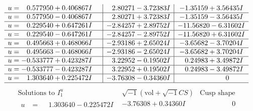 \documentclass[1p]{elsarticle_modified}
\theoremstyle{definition}
\newcommand{\I}{\sqrt{-1}}
\begin{document}
$$\begin{array}{c|c|c}
\begin{aligned}
u &= \phantom{-}0.577950 + 0.406867 I\end{aligned}
 & \phantom{-}2.80271 - 3.72383 I & -1.35159 + 3.56435 I \\ \hline\begin{aligned}
u &= \phantom{-}0.577950 - 0.406867 I\end{aligned}
 & \phantom{-}2.80271 + 3.72383 I & -1.35159 - 3.56435 I \\ \hline\begin{aligned}
u &= \phantom{-}0.229540 + 0.647261 I\end{aligned}
 & -2.84257 + 2.89752 I & -11.56820 - 6.31602 I \\ \hline\begin{aligned}
u &= \phantom{-}0.229540 - 0.647261 I\end{aligned}
 & -2.84257 - 2.89752 I & -11.56820 + 6.31602 I \\ \hline\begin{aligned}
u &= \phantom{-}0.495663 + 0.468066 I\end{aligned}
 & -2.93186 + 2.65024 I & -3.65682 - 3.70204 I \\ \hline\begin{aligned}
u &= \phantom{-}0.495663 - 0.468066 I\end{aligned}
 & -2.93186 - 2.65024 I & -3.65682 + 3.70204 I \\ \hline\begin{aligned}
u &= -0.533777 + 0.423287 I\end{aligned}
 & \phantom{-}3.22952 - 0.19502 I & \phantom{-}0.24983 + 3.49872 I \\ \hline\begin{aligned}
u &= -0.533777 - 0.423287 I\end{aligned}
 & \phantom{-}3.22952 + 0.19502 I & \phantom{-}0.24983 - 3.49872 I \\ \hline\begin{aligned}
u &= \phantom{-}1.303640 + 0.225472 I\end{aligned}
 & -3.76308 - 0.34360 I & \phantom{-0.000000 } 0\\
 \hline 
 \end{array}$$\newpage$$\begin{array}{c|c|c}  
\text{Solutions to }I^u_{1}& \I (\text{vol} + \sqrt{-1}CS) & \text{Cusp shape}\\
 \hline 
\begin{aligned}
u &= \phantom{-}1.303640 - 0.225472 I\end{aligned}
 & -3.76308 + 0.34360 I & \phantom{-0.000000 } 0 \\ \hline\begin{aligned}

\end{aligned}
\end{array}$$
\end{document}
